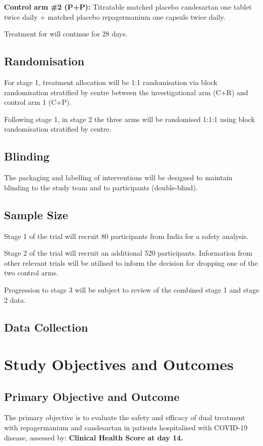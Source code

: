 \documentclass[11pt,parskip=half-]{scrartcl}
\begin{document}
\textbf{Control arm \#2 (P+P):}  Titratable matched placebo candesartan
one tablet twice daily + matched placebo repagermanium one capsule twice daily.

Treatment for will continue for 28 days.

\subsection{Randomisation}
For stage 1, treatment allocation will be 1:1 randomisation via block randomisation stratified by centre between the investigational arm (C+R) and control arm 1 (C+P). 

Following stage 1, in stage 2 the three arms will be randomised 1:1:1 using block randomisation stratified by centre.

\subsection{Blinding}
The packaging and labelling of interventions will be designed to maintain blinding to the study team and to participants (double-blind).

\subsection{Sample Size}
Stage 1 of the trial will recruit 80 participants from India for a safety analysis. 

Stage 2 of the trial will recruit an additional 520 participants. Information from other relevant trials will be utilised to inform the decision for dropping one of the two control arms.

Progression to stage 3 will be subject to review of the combined stage 1 and stage 2 data.

\subsection{Data Collection}

\clearpage

\section{Study Objectives and Outcomes}

\subsection{Primary Objective and Outcome}
The primary objective is to evaluate the safety and efficacy of dual treatment with repagermanium and candesartan in patients hospitalised with COVID-19 disease, assessed by: \textbf{Clinical Health Score at day 14.}
\end{document}
